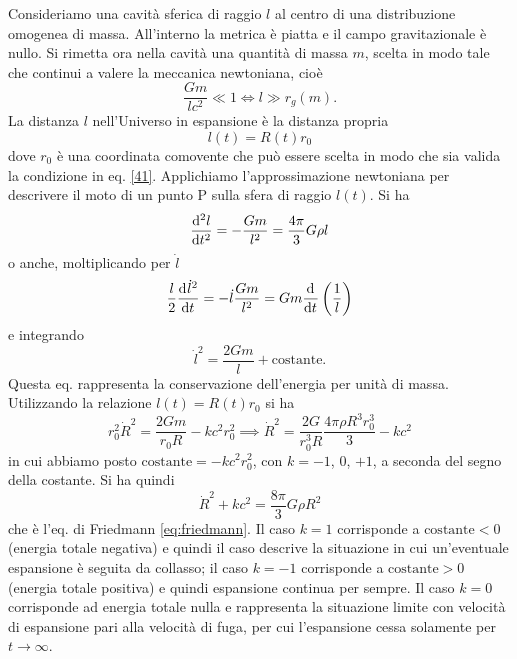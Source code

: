 Consideriamo una cavità sferica di raggio $l$ al centro di una distribuzione
omogenea di massa.  All'interno la metrica è piatta e il campo gravitazionale è
nullo.  Si rimetta ora nella cavità una quantità di massa $m$, scelta in modo
tale che continui a valere la meccanica newtoniana, cioè
\begin{equation}
  \frac{Gm}{l c^2} \ll 1 \iff l \gg r_g(m).
  \label{41}
\end{equation}
La distanza $l$ nell'Universo in espansione è la distanza propria
\begin{equation}
  l(t) = R(t) r_0
\end{equation}
dove $r_0$ è una coordinata comovente che può essere scelta in modo che sia
valida la condizione in eq. \eqref{41}.  Applichiamo l'approssimazione
newtoniana per descrivere il moto di un punto P sulla sfera di raggio $l(t)$.
Si ha
\begin{equation}
  \toder[2]{l}{t} = -\frac{G m}{l^2} = \frac{4 \pi}{3} G \rho l
  \label{1103}
\end{equation}
o anche, moltiplicando per $\dot l$
\begin{equation}
  \frac{l}{2} \frac{{\mathop{}\!\mathrm{d}^{}}\dot{l}^2}{\mathop{}\!\mathrm{d} {t}^{}} = - \dot{l} \frac{G m}{l^2} = Gm  \frac{{\mathop{}\!\mathrm{d}^{}}}{\mathop{}\!\mathrm{d} {t}^{}}
  \left( \frac{1}{l} \right)
\end{equation}
e integrando
\begin{equation}
  \dot{l}^2 = \frac{2G m}{l} + \text{costante}.
  \label{219}
\end{equation}
Questa eq. rappresenta la conservazione dell'energia per unità di massa.
Utilizzando la relazione $l(t)=R(t) r_0$ si ha
\begin{equation}
  r_0^2 \dot{R}^2 = \frac{2Gm}{r_0 R} - k c^2 r_0^2
  \implies \dot{R}^2 = \frac{2G}{r_0^3 R} \frac{4 \pi \rho R^3 r_0^3}{3} - k c^2
\end{equation}
in cui abbiamo posto $\text{costante} = - k c^2 r_0^2$, con $k=-1$, $0$, $+1$, a
seconda del segno della costante.  Si ha quindi
\begin{equation}
  \dot{R}^2 + k c^2 = \frac{8 \pi}{3} G \rho R^2
  \label{1106}
\end{equation}
che è l'eq. di Friedmann \eqref{eq:friedmann}.  Il caso $k=1$ corrisponde a
$\text{costante}<0$ (energia totale negativa) e quindi il caso descrive la
situazione in cui un'eventuale espansione è seguita da collasso; il caso $k=-1$
corrisponde a $\text{costante}>0$ (energia totale positiva) e quindi espansione
continua per sempre.  Il caso $k=0$ corrisponde ad energia totale nulla e
rappresenta la situazione limite con velocità di espansione pari alla velocità
di fuga, per cui l'espansione cessa solamente per $t\to \infty$.

